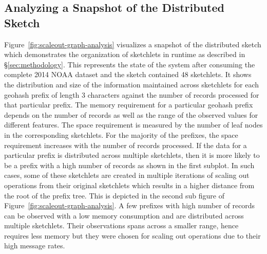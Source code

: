 \subsection{Analyzing a Snapshot of the Distributed Sketch}
Figure~\ref{fig:scaleout-graph-analysis} visualizes a snapshot of the distributed sketch which demonstrates the organization of sketchlets in runtime as described in \S\ref{sec:methodology}. 
This represents the state of the system after consuming the complete 2014 NOAA dataset and the sketch contained 48 sketchlets. 
It shows the distribution and size of the information maintained across sketchlets for each geohash prefix of length 3 characters against the number of records processed for that particular prefix.
The memory requirement for a particular geohash prefix depends on the number of records as well as the range of the observed values for different features.
The space requirement is measured by the number of leaf nodes in the corresponding sketchlets.
For the majority of the prefixes, the space requirement increases with the number of records processed.
If the data for a particular prefix is distributed across multiple sketchlets, then it is more likely to be a prefix with a high number of records as shown in the first subplot.
In such cases, some of these sketchlets are created in multiple iterations of scaling out operations from their original sketchlets which results in a higher distance from the root of the prefix tree. This is depicted in the second sub figure of Figure~\ref{fig:scaleout-graph-analysis}.
A few prefixes with high number of records can be observed with a low memory consumption and are distributed across multiple sketchlets.
Their observations spans across a smaller range, hence requires less memory but they were chosen for scaling out operations due to their high message rates. 

